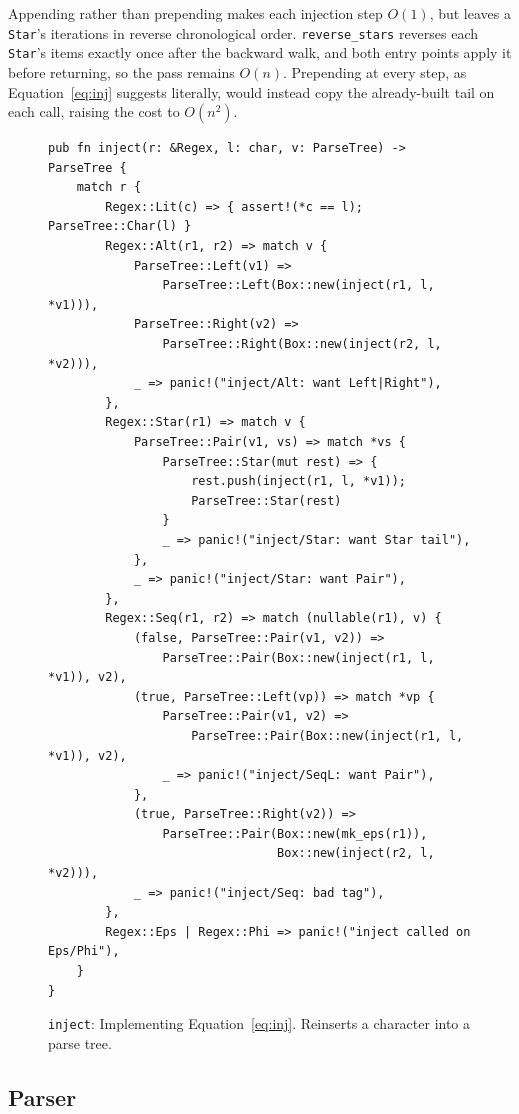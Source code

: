 Appending rather than prepending makes each injection step $O(1)$, 
but leaves a \texttt{Star}'s iterations in reverse chronological order.
\texttt{reverse\_stars} reverses each \texttt{Star}'s items exactly once
after the backward walk, and both entry points apply it before returning,
so the pass remains $O(n)$. 
Prepending at every step, as Equation~\eqref{eq:inj} suggests literally, 
would instead copy the already-built tail on each call, raising the cost to $O(n^2)$.

\begin{figure}[H]
\small
\begin{verbatim}
pub fn inject(r: &Regex, l: char, v: ParseTree) -> ParseTree {
    match r {
        Regex::Lit(c) => { assert!(*c == l); ParseTree::Char(l) }
        Regex::Alt(r1, r2) => match v {
            ParseTree::Left(v1) =>
                ParseTree::Left(Box::new(inject(r1, l, *v1))),
            ParseTree::Right(v2) =>
                ParseTree::Right(Box::new(inject(r2, l, *v2))),
            _ => panic!("inject/Alt: want Left|Right"),
        },
        Regex::Star(r1) => match v {
            ParseTree::Pair(v1, vs) => match *vs {
                ParseTree::Star(mut rest) => {
                    rest.push(inject(r1, l, *v1));
                    ParseTree::Star(rest)
                }
                _ => panic!("inject/Star: want Star tail"),
            },
            _ => panic!("inject/Star: want Pair"),
        },
        Regex::Seq(r1, r2) => match (nullable(r1), v) {
            (false, ParseTree::Pair(v1, v2)) =>
                ParseTree::Pair(Box::new(inject(r1, l, *v1)), v2),
            (true, ParseTree::Left(vp)) => match *vp {
                ParseTree::Pair(v1, v2) =>
                    ParseTree::Pair(Box::new(inject(r1, l, *v1)), v2),
                _ => panic!("inject/SeqL: want Pair"),
            },
            (true, ParseTree::Right(v2)) =>
                ParseTree::Pair(Box::new(mk_eps(r1)),
                                Box::new(inject(r2, l, *v2))),
            _ => panic!("inject/Seq: bad tag"),
        },
        Regex::Eps | Regex::Phi => panic!("inject called on Eps/Phi"),
    }
}
\end{verbatim}
\caption{\texttt{inject}: Implementing Equation~\eqref{eq:inj}. 
Reinserts a character into a parse tree.}
\label{fig:inject-rust}
\end{figure}

%
%
%

\subsection{Parser}
\label{sec:deriv-std-parser}

